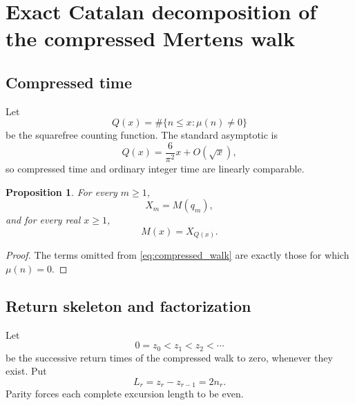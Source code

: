 \documentclass[11pt]{amsart}
\numberwithin{equation}{section}
\theoremstyle{plain}
\newtheorem{proposition}[theorem]{Proposition}
\theoremstyle{definition}
\theoremstyle{remark}
\newcommand{\Mob}{\mu}
\newcommand{\Mert}{M}
\newcommand{\Qsf}{Q}
\begin{document}
\section{Exact Catalan decomposition of the compressed Mertens walk}
\label{sec:exact_catalan_decomposition}

\subsection{Compressed time}
\label{subsec:compressed_time}

Let
\begin{equation}
\Qsf(x)=\#\{n\le x:\Mob(n)\ne0\}
\label{eq:squarefree_count}
\end{equation}
be the squarefree counting function.  The standard asymptotic is
\begin{equation}
\Qsf(x)=\frac{6}{\pi^2}x+O(\sqrt{x}),
\label{eq:squarefree_density}
\end{equation}
so compressed time and ordinary integer time are linearly comparable.

\begin{proposition}
\label{prop:compression_identity}
For every $m\ge1$,
\begin{equation}
X_m=\Mert(q_m),
\label{eq:compression_identity}
\end{equation}
and for every real $x\ge1$,
\begin{equation}
\Mert(x)=X_{\Qsf(x)}.
\label{eq:decompression_identity}
\end{equation}
\end{proposition}

\begin{proof}
The terms omitted from \eqref{eq:compressed_walk} are exactly those for which $\Mob(n)=0$.
\end{proof}

\subsection{Return skeleton and factorization}
\label{subsec:return_skeleton}

Let
\begin{equation}
0=z_0<z_1<z_2<\cdots
\label{eq:return_times}
\end{equation}
be the successive return times of the compressed walk to zero, whenever they exist.  Put
\begin{equation}
L_r=z_r-z_{r-1}=2n_r.
\label{eq:excursion_lengths}
\end{equation}
Parity forces each complete excursion length to be even.
\end{document}
